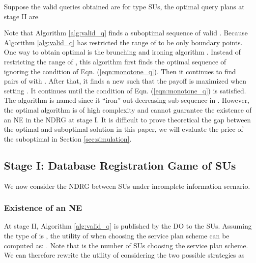 \documentclass[journal]{IEEEtran}
\begin{document}
Suppose the valid queries obtained are  for type  SUs, the optimal query plans at stage II are


Note that Algorithm \ref{alg:valid_q} finds a suboptimal sequence of valid . Because Algorithm \ref{alg:valid_q} has restricted the range of  to be only boundary points. One way to obtain optimal  is the brunching and ironing algorithm \cite{contract_book}. Instead of restricting the range of , this algorithm first finds the optimal sequence of  ignoring the condition of Eqn. (\ref{eqn:monotone_q}). Then it continues to find pairs of  with . After that, it finds a new  such that the payoff is maximized when setting . It continues until the condition of Eqn. (\ref{eqn:monotone_q}) is satisfied. The algorithm is named since it ``iron'' out decreasing sub-sequence in .  However, the optimal algorithm is of high complexity and cannot guarantee the existence of an NE in the NDRG at stage I. It is difficult to prove theoretical the gap between the optimal and suboptimal solution in this paper, we will evaluate the price of the suboptimal  in Section \ref{sec:simulation}.

\subsection{Stage I: Database Registration Game of SUs}

We now consider the NDRG between SUs under incomplete information scenario.

\subsubsection{Existence of an NE}

At stage II, Algorithm \ref{alg:valid_q} is published by the DO to the SUs. Assuming the type of  is , the utility of  when choosing the service plan scheme can be computed as:
.
Note that  is the number of SUs choosing the service plan scheme. We can therefore rewrite the utility of  considering the two possible strategies as
\end{document}
